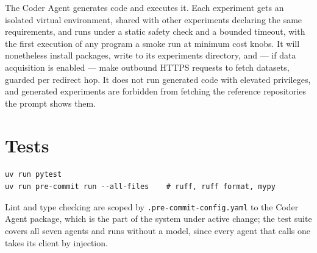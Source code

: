 The Coder Agent generates code and executes it. Each experiment gets an isolated
virtual environment, shared with other experiments declaring the same
requirements, and runs under a static safety check and a bounded timeout, with
the first execution of any program a smoke run at minimum cost knobs. It will
nonetheless install packages, write to its experiments directory, and --- if
data acquisition is enabled --- make outbound HTTPS requests to fetch datasets,
guarded per redirect hop. It does not run generated code with elevated
privileges, and generated experiments are forbidden from fetching the reference
repositories the prompt shows them.

\section*{Tests}

\begin{lstlisting}[language={}]
uv run pytest
uv run pre-commit run --all-files    # ruff, ruff format, mypy
\end{lstlisting}

Lint and type checking are scoped by \texttt{.pre-commit-config.yaml} to the
Coder Agent package, which is the part of the system under active change; the
test suite covers all seven agents and runs without a model, since every agent
that calls one takes its client by injection.
